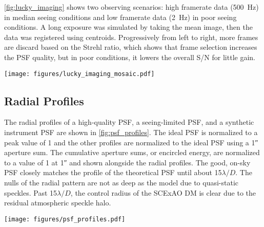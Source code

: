 \autoref{fig:lucky_imaging} shows two observing scenarios: high framerate data (\SI{500}{\hertz}) in median seeing conditions and low framerate data (\SI{2}{\hertz}) in poor seeing conditions. A long exposure was simulated by taking the mean image, then the data was registered using centroids. Progressively from left to right, more frames are discard based on the Strehl ratio, which shows that frame selection increases the PSF quality, but in poor conditions, it lowers the overall S/N for little gain.

\begin{figure*}
    \centering
    \texttt{[image: figures/lucky\_imaging\_mosaic.pdf]}
    \caption{Post-processing data with lucky imaging. All data are shown with a log stretch and separate limits for each frame. (Top) high-framerate (\SI{500}{\hertz}) data in median seeing conditions. (Bottom) low-framerate (\SI{2}{\hertz}) data in mediocre seeing conditions. (Long Exp.) a mean combination without alignment, simulating a long exposure. (Shift-and-add) co-registering each frame before collapsing. (Discarding X\%) same as shift-and-add but discarding a percentage of data based on the Strehl ratio.\label{fig:lucky_imaging}}
\end{figure*}

\subsection{Radial Profiles}
The radial profiles of a high-quality PSF, a seeing-limited PSF, and a synthetic instrument PSF are shown in \autoref{fig:psf_profiles}. The ideal PSF is normalized to a peak value of 1 and the other profiles are normalized to the ideal PSF using a \ang{;;1} aperture sum. The cumulative aperture sums, or encircled energy, are normalized to a value of 1 at \ang{;;1} and shown alongside the radial profiles. The good, on-sky PSF closely matches the profile of the theoretical PSF until about 15$\lambda/D$. The nulls of the radial pattern are not as deep as the model due to quasi-static speckles. Past 15$\lambda/D$, the control radius of the SCExAO DM is clear due to the residual atmospheric speckle halo.

\begin{figure*}
    \centering
    \texttt{[image: figures/psf\_profiles.pdf]}
    \caption{Radial profiles and encircled energy in different observing scenarios. (Left) radial profiles normalized to an ideal PSF (gray), a high-quality on-sky PSF (the same as \autoref{fig:onsky_psf}, solid red), a poor-quality on-sky PSF (the same as \autoref{fig:bad_psfs}, dashed red), and an on-sky coronagraphic PSF with the \SI{59}{\mas} IWA (solid blue). The $1\sigma$ raw contrast curves are shown for the good PSF (dotted red) and the coronagraphic PSF (dotted blue). The control radius of the SCExAO DM is marked with a vertical gray line. (Right) the encircled energy normalized to an ideal PSF with a max radius of \ang{;;1} (gray), a good on-sky PSF (solid red), and a poor-quality PSF (dashed red). The control radius of the SCExAO DM is marked with a vertical gray line.\label{fig:psf_profiles}}
\end{figure*}

